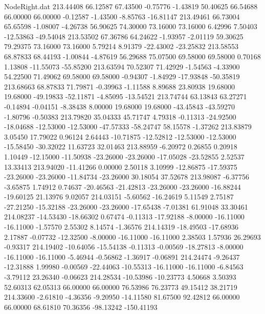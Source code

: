 \begin{filecontents}{NodeRight.dat}
 213.44408   66.12587   67.43500    -0.75776   -1.43819   50.40625   66.54688   66.00000   66.00000   -0.12587   -1.43500   -8.85763  -16.81147
 213.49461   66.73004   65.65598    -1.08007   -4.26738   56.90625   74.30000   73.16000   73.16000    6.42996    7.50403  -12.53863  -49.54048
 213.53502   67.36786   64.24622    -1.93957   -2.01119   59.30625   79.29375   73.16000   73.16000    5.79214    8.91379  -22.43002  -23.25832
 213.58553   68.87833   68.44193    -1.00844   -4.87619   56.29688   75.07500   69.58000   69.58000    0.70168    1.13808  -11.55073  -55.85200
 213.63594   70.52307   71.42929    -1.54563   -4.33900   54.22500   71.49062   69.58000   69.58000   -0.94307   -1.84929  -17.93848  -50.35819
 213.68663   68.87833   71.79871    -0.39963   -1.11588    8.89688   23.80938   19.68000   19.68000  -49.19833  -52.11871   -4.85095  -13.54521
 213.74744   63.13843   63.27271    -0.14894   -0.04151   -8.38438    8.00000   19.68000   19.68000  -43.45843  -43.59270   -1.80796   -0.50383
 213.79820   35.04333   45.71747     4.79318   -0.11313  -24.92500  -18.04688  -12.53000  -12.53000  -47.57333  -58.24747   58.15578   -1.37262
 213.83879    3.05450   17.79022     0.96124    2.64443  -10.71875  -12.52812  -12.53000  -12.53000  -15.58450  -30.32022   11.63723   32.01463
 213.88959   -6.20972    0.26855     0.20918    1.10449  -12.15000  -11.50938  -23.26000  -23.26000  -17.05028  -23.52855    2.52537   13.33413
 213.94020  -11.41266    0.00000     2.50118    3.10999  -12.86875  -17.59375  -23.26000  -23.26000  -11.84734  -23.26000   30.18054   37.52678
 213.98087   -6.37756   -3.65875     1.74912    0.74637  -20.46563  -21.42813  -23.26000  -23.26000  -16.88244  -19.60125   21.13976    9.02057
 214.03151   -5.60562  -16.24619     5.11549    2.75187  -27.21250  -15.32188  -23.26000  -23.26000  -17.65438   -7.01381   61.91048   33.30461
 214.08237  -14.53430  -18.66302     0.67474   -0.11313  -17.92188   -8.00000  -16.11000  -16.11000   -1.57570    2.55302    8.14574   -1.36576
 214.14319  -18.49503  -17.68936     2.17887   -0.07732  -12.32500   -8.00000  -16.11000  -16.11000    2.38503    1.57936   26.29693   -0.93317
 214.19402  -10.64056  -15.54138    -0.11313   -0.00569  -18.27813   -8.00000  -16.11000  -16.11000   -5.46944   -0.56862   -1.36917   -0.06891
 214.24474   -9.26437  -12.31888     1.99980   -0.00569  -22.44063  -10.55313  -16.11000  -16.11000   -6.84563   -3.79112   23.26340   -0.06623
 214.28534  -10.53986  -10.23773     4.50668    3.50393   52.60313   62.05313   66.00000   66.00000   76.53986   76.23773   49.15412   38.21719
 214.33600   -2.61810   -4.36356    -9.20950  -14.11580   81.67500   92.42812   66.00000   66.00000   68.61810   70.36356  -98.13242 -150.41193

\end{filecontents}
